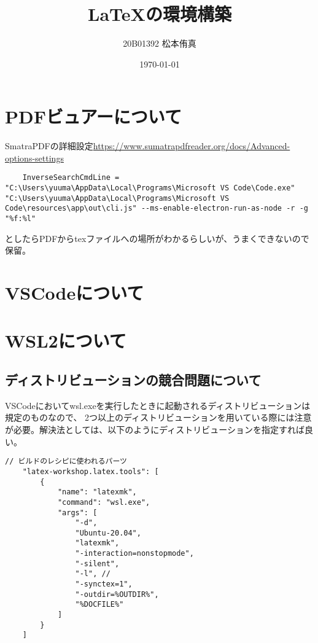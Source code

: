



\title{{\LaTeX}の環境構築}
\author{20B01392 松本侑真}
\date{\today}
\maketitle
\tableofcontents
\newpage

\section{PDFビュアーについて}
SmatraPDFの詳細設定\url{https://www.sumatrapdfreader.org/docs/Advanced-options-settings}

\begin{lstlisting}
	InverseSearchCmdLine = "C:\Users\yuuma\AppData\Local\Programs\Microsoft VS Code\Code.exe" "C:\Users\yuuma\AppData\Local\Programs\Microsoft VS Code\resources\app\out\cli.js" --ms-enable-electron-run-as-node -r -g "%f:%l"
\end{lstlisting}
としたらPDFからtexファイルへの場所がわかるらしいが、うまくできないので保留。

\section{VSCodeについて}

\section{WSL2について}
\subsection{ディストリビューションの競合問題について}
VSCodeにおいてwsl.exeを実行したときに起動されるディストリビューションは規定のものなので、
2つ以上のディストリビューションを用いている際には注意が必要。解決法としては、以下のようにディストリビューションを指定すれば良い。

\begin{lstlisting}[caption=ディストリビューションの指定]
	// ビルドのレシピに使われるパーツ
	"latex-workshop.latex.tools": [
		{
			"name": "latexmk",
			"command": "wsl.exe",
			"args": [
				"-d",
				"Ubuntu-20.04",
				"latexmk",
				"-interaction=nonstopmode",
				"-silent",
				"-l", //
				"-synctex=1",
				"-outdir=%OUTDIR%",
				"%DOCFILE%"
			]
		}
	]
	\end{lstlisting}

\subsection{}

